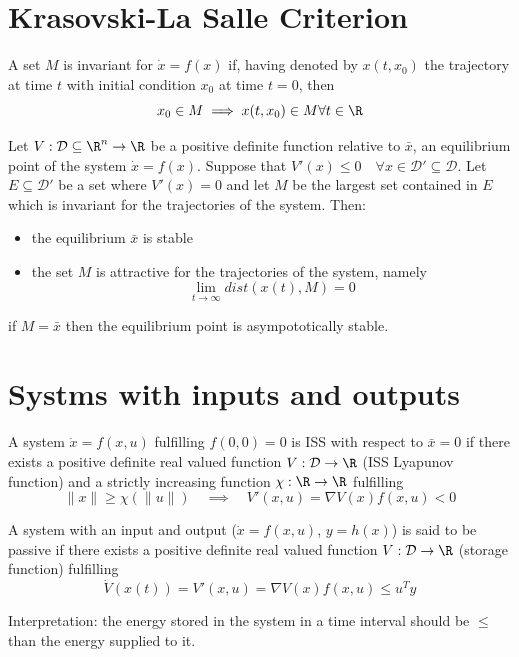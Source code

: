 \documentclass[english]{lectures}
\begin{document}
\section{Krasovski-La Salle Criterion}


\begin{definition}
    A set $M$ is invariant for $\dot{x}=f(x)$ if, having denoted by $x(t,x_0)$ the trajectory at time $t$ with initial condition $x_0$ at time $t=0$, then
    \[
        x_0\in M \implies x(t,x_0)\in M \forall t \in \R
    \]    
\end{definition}

\begin{theorem}
    Let $V:\mathcal{D}\subseteq \R^n\to\R$ be a positive definite function relative to $\bar{x}$, an equilibrium point of the system $\dot{x}=f(x)$. Suppose that $V'(x)\leq 0 \quad \forall x\in\mathcal{D}'\subseteq \mathcal{D}$. Let $E\subseteq \mathcal{D}'$ be a set where $V'(x)=0$ and let $M$ be the largest set contained in $E$ which is invariant for the trajectories of the system. Then:
    \begin{itemize}
        \item the equilibrium $\bar{x}$ is stable
        \item the set $M$ is attractive for the trajectories of the system, namely \[\lim_{t\to\infty}dist(x(t),M)=0\]
    \end{itemize}
\end{theorem}
\begin{corollary}
    if $M=\bar{x}$ then the equilibrium point is asympototically stable.
\end{corollary}

\section{Systms with inputs and outputs}
\begin{definition}
    A system $\dot{x}=f(x,u)$ fulfilling $f(0,0)=0$ is ISS with respect to $\bar{x}=0$ if there exists a positive definite real valued function $V:\mathcal{D}\to \R$ (ISS Lyapunov function) and a strictly increasing function $\chi:\R\to\R$ fulfilling 
    \[
        \|x\|\geq\chi(\|u\|) \quad \implies \quad V'(x,u)= \nabla V(x)f(x,u)<0
    \]
\end{definition}

\begin{definition}[passivity]
    A system with an input and output ($\dot{x}=f(x,u)$, $y=h(x)$) is said to be passive if there exists a positive definite real valued function $V:\mathcal{D}\to\R$ (storage function) fulfilling
    \[
        \dot{V}(x(t))=V'(x,u)=\nabla V(x)f(x,u)\leq u^Ty
    \]
\end{definition}
Interpretation: the energy stored in the system in a time interval should be $\leq$ than the energy supplied to it.
\end{document}

